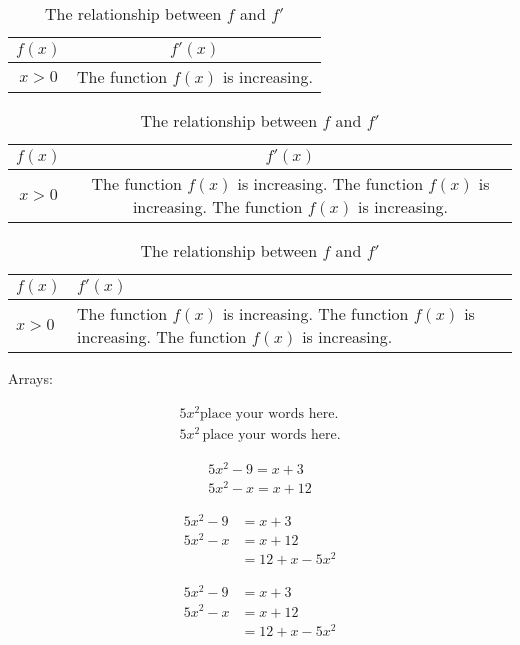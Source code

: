 \documentclass{article}
\begin{document}
\begin{table}[H]
\centering %
\caption{The relationship between $f$ and $f'$}
\def\arraystretch{1.2} %
\begin{tabular}{|c|c|}
\hline
$f(x)$ & $f'(x)$ \\ \hline
$x > 0$ & The function $f(x)$ is increasing. \\ \hline
\end{tabular} 
\end{table}


\begin{table}[H]
\centering %
\caption{The relationship between $f$ and $f'$}
\def\arraystretch{1.2} %
\begin{tabular}{|c|c|}
\hline
$f(x)$ & $f'(x)$ \\ \hline
$x > 0$ & The function $f(x)$ is increasing. The function $f(x)$ is increasing. The function $f(x)$ is increasing. \\ \hline
\end{tabular} 
\end{table}


\begin{table}[H]
\centering %
\caption{The relationship between $f$ and $f'$}
\def\arraystretch{1.2} %
\begin{tabular}{|l|p{3in}|} %
\hline
$f(x)$ & $f'(x)$ \\ \hline
$x > 0$ & The function $f(x)$ is increasing. The function $f(x)$ is increasing. The function $f(x)$ is increasing. \\ \hline
\end{tabular} 
\end{table}


Arrays:

\begin{align}
5x^2 \text{place your words here.}\\
5x^2 \, \text{place your words here.}
\end{align}

\begin{align}
5x^2-9 = x+3\\
5x^2-x = x+12
\end{align}

\begin{align*} %
5x^2-9 &= x+3\\
5x^2-x &= x+12\\
&=12+x-5x^2
\end{align*}


\begin{align}
5x^2-9 &= x+3\\
5x^2-x &= x+12\\
&=12+x-5x^2
\end{align}
\end{document}
